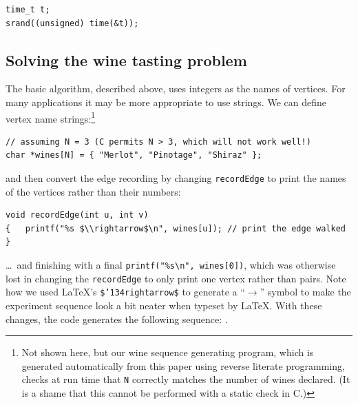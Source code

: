 \documentclass[12pt]{article}
\begin{document}
\begin{verbatim}
time_t t;
srand((unsigned) time(&t)); 
\end{verbatim}

\subsection{Solving the wine tasting problem}
The basic algorithm, described above, uses integers as the names of vertices. For many applications it may be more appropriate to use strings. We can define vertex name strings:\footnote{Not shown here, but our wine sequence generating program, which is generated automatically from this paper using reverse literate programming, checks at run time that \texttt{N} correctly matches the number of wines declared. (It is a shame that this cannot be performed with a static check in C.)}

\begin{verbatim}
// assuming N = 3 (C permits N > 3, which will not work well!)
char *wines[N] = { "Merlot", "Pinotage", "Shiraz" }; 
\end{verbatim}

and then convert the edge recording by changing \texttt{recordEdge} to print the names of the vertices rather than their numbers: 

\begin{Verbatim}
void recordEdge(int u, int v) 
{   printf("%s $\\rightarrow$\n", wines[u]); // print the edge walked
}
\end{Verbatim}

\label{winelist}
\ldots\ and finishing with a final \verb|printf("%s\n", wines[0])|, which was otherwise lost in changing the \verb|recordEdge| to only print one vertex rather than pairs. Note how we used \LaTeX's \texttt{\$\char'134rightarrow\$} to generate a ``$\rightarrow$'' symbol to make the experiment sequence look a bit neater when typeset by \LaTeX\@. With these changes, the code generates the following sequence: \unskip.
\end{document}
